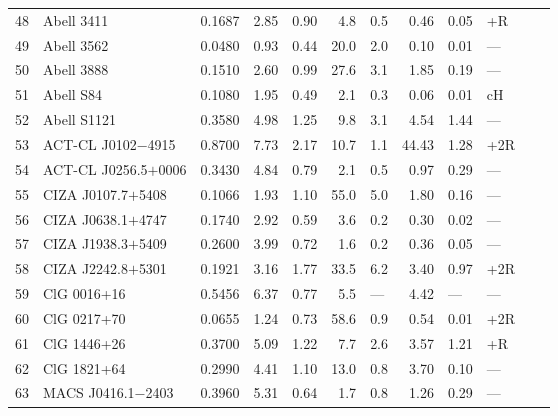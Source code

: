 \begin{ThreePartTable}
\begin{longtable}{clcccr@{$\,\pm\,$}lr@{$\,\pm\,$}llll}
48 & Abell 3411            & 0.1687 & 2.85 & 0.90 &   4.8 &  0.5          &  0.46 &  0.05 & +R  & \parencite{vanWeeren2013}  \\
49 & Abell 3562            & 0.0480 & 0.93 & 0.44 &  20.0 &  2.0          &  0.10 &  0.01 & --- & \parencite{venturi2003}  \\
50 & Abell 3888            & 0.1510 & 2.60 & 0.99 &  27.6 &  3.1          &  1.85 &  0.19 & --- & \parencite{shakouri2016}  \\
51 & Abell S84             & 0.1080 & 1.95 & 0.49 &   2.1 &  0.3\tnote{h} &  0.06 &  0.01 & cH  & \parencite{duchesne2017}  \\
52 & Abell S1121           & 0.3580 & 4.98 & 1.25 &   9.8 &  3.1\tnote{h} &  4.54 &  1.44 & --- & \parencite{duchesne2017}  \\
53 & ACT-CL J0102$-$4915   & 0.8700 & 7.73 & 2.17 &  10.7 &  1.1\tnote{i} & 44.43 &  1.28 & +2R & \parencite{lindner2014}  \\
54 & ACT-CL J0256.5$+$0006 & 0.3430 & 4.84 & 0.79 &   2.1 &  0.5\tnote{i} &  0.97 &  0.29 & --- & \parencite{knowles2016}  \\
55 & CIZA J0107.7$+$5408   & 0.1066 & 1.93 & 1.10 &  55.0 &  5.0          &  1.80 &  0.16 & --- & \parencite{vanWeeren2011}  \\
56 & CIZA J0638.1$+$4747   & 0.1740 & 2.92 & 0.59 &   3.6 &  0.2          &  0.30 &  0.02 & --- & \parencite{cuciti2018}  \\
57 & CIZA J1938.3$+$5409   & 0.2600 & 3.99 & 0.72 &   1.6 &  0.2\tnote{b} &  0.36 &  0.05 & --- & \parencite{bonafede2015}  \\
58 & CIZA J2242.8$+$5301   & 0.1921 & 3.16 & 1.77 &  33.5 &  6.2\tnote{j} &  3.40 &  0.97 & +2R & \parencite{govoni2012}  \\
59 & ClG 0016+16           & 0.5456 & 6.37 & 0.77 &   5.5 &  ---          &  4.42 &  ---  & --- & \parencite{giovannini2000}  \\
60 & ClG 0217+70           & 0.0655 & 1.24 & 0.73 &  58.6 &  0.9          &  0.54 &  0.01 & +2R & \parencite{brown2011}  \\
61 & ClG 1446+26           & 0.3700 & 5.09 & 1.22 &   7.7 &  2.6          &  3.57 &  1.21 & +R  & \parencite{govoni2012}  \\
62 & ClG 1821+64           & 0.2990 & 4.41 & 1.10 &  13.0 &  0.8\tnote{k} &  3.70 &  0.10 & --- & \parencite{bonafede2014b}  \\
63 & MACS J0416.1$-$2403   & 0.3960 & 5.31 & 0.64 &   1.7 &  0.8\tnote{l} &  1.26 &  0.29 & --- & \parencite{pandeyPommier2015}  \\

\end{longtable}
\end{ThreePartTable}
